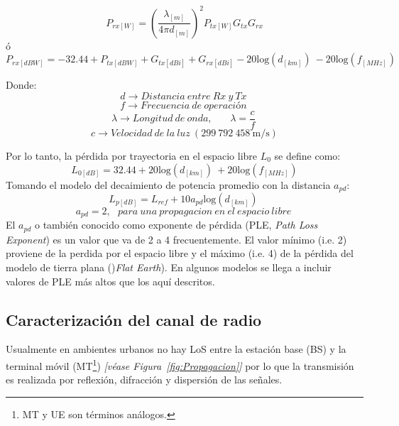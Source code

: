 \begin{equation}
P_{rx\left[W\right]}={\left(\frac{{\lambda }_{[m]}}{4\pi d_{[m]}}\right)}^2P_{tx\left[W\right]}G_{tx}G_{rx}  
\label{eqn:Friis}
\end{equation}
ó
\begin{equation}
P_{rx\left[dBW\right]}=-32.44+P_{tx\left[dBW\right]}+G_{tx\left[dBi\right]}+G_{rx\left[dBi\right]}-20{\mathrm{log} \left(d_{\left[km\right]}\right)\ }-20{\mathrm{log} \left(f_{\left[MHz\right]}\right)\ }
\label{eqn:Friss_dB}
\end{equation}

Donde:
\[d\to Distancia\ entre\ Rx\ y\ Tx\ \] 
\[f\to Frecuencia\ de\ operaci\textrm{ó}n\ \] 
\[\lambda \to Longitud\ de\ onda,\ \ \ \ \ \ \ \ \lambda =\frac{c}{f}\ \] 
\[c\to Velocidad\ de\ la\ luz\ (\mathrm{299\ 792\ 458\ m/s})\] 

Por lo tanto, la pérdida por trayectoria en el espacio libre $L_0$ se define como:
\begin{equation}
L_{0[dB]}=32.44+20{\mathrm{log} \left(d_{\left[km\right]}\right)\ }+20\mathrm{log}\mathrm{}(f_{[MHz]})
\label{eqn:L0}
\end{equation}
Tomando el modelo del decaimiento de potencia promedio con la distancia $a_{pd}$:
\begin{equation}
L_{p[dB]}=L_{ref}+10a_{pd}{\mathrm{log} \left(d_{\left[km\right]}\right)\ }
\label{eqn:Lp_ref}
\end{equation}
\[a_{pd}=2,\ \ \ para\ una\ propagacion\ en\ el\ espacio\ libre\ \] 
El $a_{pd}$ o también conocido como exponente de pérdida (PLE, \textit{Path Loss Exponent}) es un valor que va de 2 a 4 frecuentemente. El valor mínimo (i.e. 2) proviene de la perdida por el espacio libre y el máximo (i.e. 4) de la pérdida del modelo de tierra plana ()\textit{Flat Earth}). En algunos modelos se llega a incluir valores de PLE más altos que los aquí descritos.

\subsection{Caracterización del canal de radio}

Usualmente en ambientes urbanos no hay LoS entre la estación base (BS) y la terminal móvil (MT\footnote{MT y UE son términos análogos.}) \textit{[véase Figura~\ref{fig:Propagacion}]} por lo que la transmisión es realizada por reflexión, difracción y dispersión de las señales.\newline

